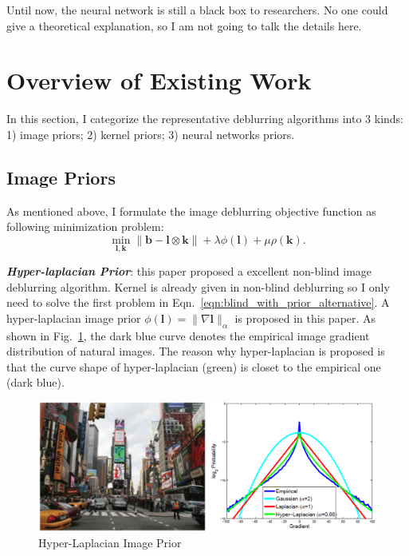 \documentclass[journal, onecolumn, 10pt]{IEEEtran}
\begin{document}
Until now, the neural network is still a black box to researchers. No one could give a theoretical explanation, so I am not going to talk the details here.

\section{Overview of Existing Work}
In this section, I categorize the representative deblurring algorithms into $3$ kinds: 1) image priors; 2) kernel priors; 3) neural networks priors.
\subsection{Image Priors}
As mentioned above, I formulate the image deblurring objective function as following minimization problem:
\begin{equation}
\min_{\mathbf{l}, \mathbf{k}} \| \mathbf{b} - \mathbf{l} \otimes \mathbf{k} \| + \lambda\phi(\mathbf{l}) + \mu \rho(\mathbf{k}).
\label{eqn:objective_funtion}
\end{equation}

\textbf{\emph{Hyper-laplacian Prior}}\cite{krishnan2009fast}: this paper proposed a excellent non-blind image deblurring algorithm. Kernel is already given in non-blind deblurring so I only need to solve the first problem in Eqn.~\ref{eqn:blind_with_prior_alternative}. A hyper-laplacian image prior $\phi(\mathbf{l}) = \|\nabla \mathbf{l}\|_{\alpha}$ is proposed in this paper. As shown in Fig.~\ref{fig:hyper_laplacian}, the dark blue curve denotes the empirical image gradient distribution of natural images. The reason why hyper-laplacian is proposed is that the curve shape of  hyper-laplacian (green) is closet to the empirical one (dark blue). 
\begin{figure}[h!]
\centering
\includegraphics[width = 1\textwidth]{pic/hyper_laplacian.png}
\caption{Hyper-Laplacian Image Prior\cite{su2016deep}}
\label{fig:hyper_laplacian}
\end{figure}
\end{document}
